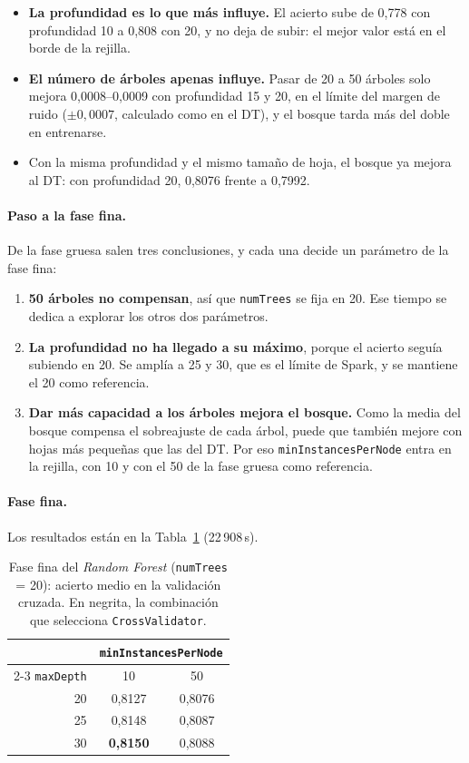 \documentclass[12pt,a4paper]{article}
\begin{document}
\begin{itemize}
    \item \textbf{La profundidad es lo que más influye.} El acierto sube de
    0,778 con profundidad 10 a 0,808 con 20, y no deja de subir: el mejor
    valor está en el borde de la rejilla.
    \item \textbf{El número de árboles apenas influye.} Pasar de 20 a 50
    árboles solo mejora 0,0008--0,0009 con profundidad 15 y 20, en el
    límite del margen de ruido ($\pm 0{,}0007$, calculado como en el
    \ac{DT}), y el bosque tarda más del doble en entrenarse.
    \item Con la misma profundidad y el mismo tamaño de hoja, el bosque ya
    mejora al \ac{DT}: con profundidad 20, 0,8076 frente a 0,7992.
\end{itemize}

\paragraph{Paso a la fase fina.} De la fase gruesa salen tres
conclusiones, y cada una decide un parámetro de la fase fina:
\begin{enumerate}
    \item \textbf{50 árboles no compensan}, así que \texttt{numTrees} se
    fija en 20. Ese tiempo se dedica a explorar los otros dos parámetros.
    \item \textbf{La profundidad no ha llegado a su máximo}, porque el
    acierto seguía subiendo en 20. Se amplía a 25 y 30, que es el límite de
    Spark, y se mantiene el 20 como referencia.
    \item \textbf{Dar más capacidad a los árboles mejora el bosque.} Como la
    media del bosque compensa el sobreajuste de cada árbol, puede que
    también mejore con hojas más pequeñas que las del \ac{DT}. Por eso
    \texttt{minInstancesPerNode} entra en la rejilla, con 10 y con el 50 de
    la fase gruesa como referencia.
\end{enumerate}

\paragraph{Fase fina.} Los resultados están en la
Tabla~\ref{tab:rf-fase2} (22\,908\,s).

\begin{table}[H]
\centering
\small
\begin{tabular}{rcc}
\toprule
 & \multicolumn{2}{c}{\texttt{minInstancesPerNode}} \\
\cmidrule(lr){2-3}
\texttt{maxDepth} & 10 & 50 \\
\midrule
20 & 0,8127 & 0,8076 \\
25 & 0,8148 & 0,8087 \\
30 & \textbf{0,8150} & 0,8088 \\
\bottomrule
\end{tabular}
\caption{Fase fina del \textit{Random Forest} (\texttt{numTrees} = 20):
acierto medio en la validación cruzada. En negrita, la combinación que
selecciona \texttt{CrossValidator}.}
\label{tab:rf-fase2}
\end{table}
\end{document}
